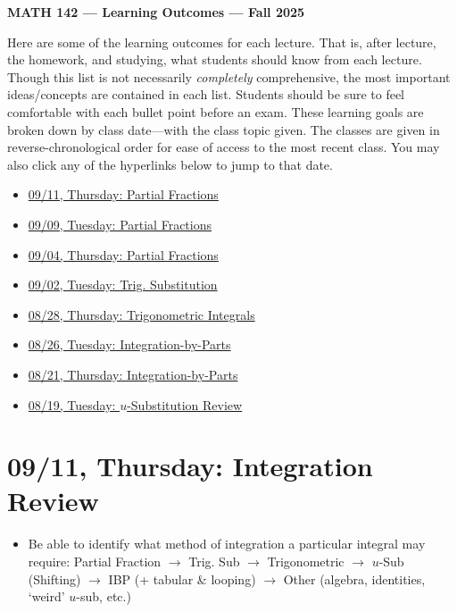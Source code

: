 \documentclass[11pt,letterpaper]{article}
\begin{document}
\begin{center} {\bfseries \LARGE MATH 142 --- Learning Outcomes --- Fall 2025} \end{center}

Here are some of the learning outcomes for each lecture. That is, after lecture, the homework, and studying, what students should know from each lecture. Though this list is not necessarily \textit{completely} comprehensive, the most important ideas/concepts are contained in each list. Students should be sure to feel comfortable with each bullet point before an exam. These learning goals are broken down by class date---with the class topic given. The classes are given in reverse-chronological order for ease of access to the most recent class. You may also click any of the hyperlinks below to jump to that date. 

\begin{itemize}
\item \hyperref[09-09]{09/11, Thursday: Partial Fractions}
\item \hyperref[09-09]{09/09, Tuesday: Partial Fractions}
\item \hyperref[09-04]{09/04, Thursday: Partial Fractions}
\item \hyperref[09-02]{09/02, Tuesday: Trig. Substitution}
\item \hyperref[08-28]{08/28, Thursday: Trigonometric Integrals}
\item \hyperref[08-26]{08/26, Tuesday: Integration-by-Parts}
\item \hyperref[08-21]{08/21, Thursday: Integration-by-Parts}
\item \hyperref[08-19]{08/19, Tuesday: $u$-Substitution Review}
\end{itemize}

\newpage
\section*{09/11, Thursday: Integration Review\label{09-11}}

\begin{itemize}
\item Be able to identify what method of integration a particular integral may require: Partial Fraction $\to$ Trig. Sub $\to$ Trigonometric $\to$ $u$-Sub (Shifting) $\to$ IBP (+ tabular \& looping) $\to$ Other (algebra, identities, `weird' $u$-sub, etc.)
\end{itemize}

\newpage
\end{document}
